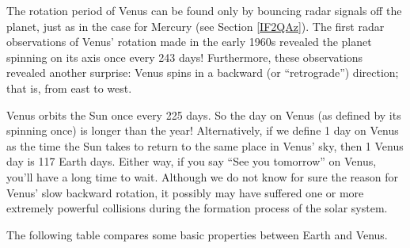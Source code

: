 \documentclass{article}
\numberwithin{equation}{section}
\numberwithin{figure}{section}
\begin{document}
\begin{center}
    \captionsetup{type=figure,margin=1in,font=scriptsize}
\end{center}

The rotation period of Venus can be found only by bouncing radar signals off the planet, just as in the case for Mercury (see Section \ref{IF2QAz}). The first radar observations of Venus' rotation made in the early 1960s revealed the planet spinning on its axis once every 243 days! Furthermore, these observations revealed another surprise: Venus spins in a backward (or ``retrograde'') direction; that is, from east to west.

\vspace{1em}

Venus orbits the Sun once every 225 days. So the day on Venus (as defined by its spinning once) is longer than the year! Alternatively, if we define 1 day on Venus as the time the Sun takes to return to the same place in Venus' sky, then 1 Venus day is 117 Earth days. Either way, if you say ``See you tomorrow'' on Venus, you’ll have a long time to wait. Although we do not know for sure the reason for Venus' slow backward rotation, it possibly may have suffered one or more extremely powerful collisions during the formation process of the solar system.

\vspace{1em}

The following table compares some basic properties between Earth and Venus.
\end{document}
